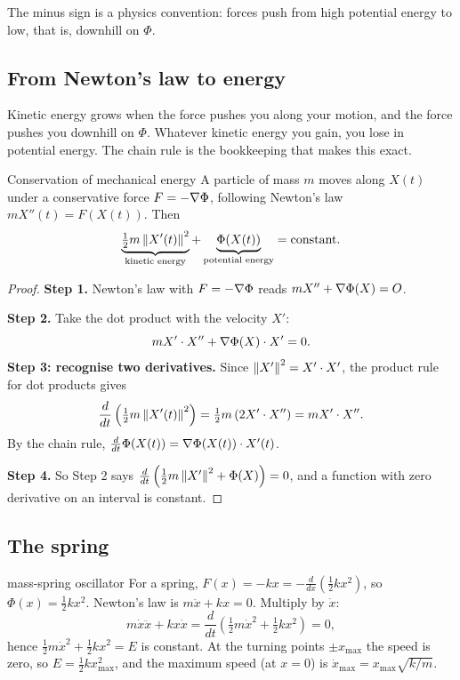 The minus sign is a physics convention: forces push from high potential energy to low, that
is, downhill on $\Phi$.

\subsection{From Newton's law to energy}

\begin{intuition}
Kinetic energy grows when the force pushes you along your motion, and the force pushes
you downhill on $\Phi$. Whatever kinetic energy you gain, you lose in potential energy.
The chain rule is the bookkeeping that makes this exact.
\end{intuition}

\begin{theorem}{Conservation of mechanical energy}
A particle of mass $m$ moves along $X(t)$ under a conservative force $F=-\nabla\Phi$,
following Newton's law $mX''(t)=F(X(t))$. Then
\[
\underbrace{\tfrac12m\left\lVert X'(t)\right\rVert^2}_{\text{kinetic energy}}+\underbrace{\Phi(X(t))}_{\text{potential energy}}=\text{constant}.
\]
\end{theorem}

\begin{proof}
\textbf{Step 1.} Newton's law with $F=-\nabla\Phi$ reads $mX''+\nabla\Phi(X)=O$.

\textbf{Step 2.} Take the dot product with the velocity $X'$:
\[ mX'\cdot X''+\nabla\Phi(X)\cdot X'=0 . \]
\textbf{Step 3: recognise two derivatives.} Since $\left\lVert X'\right\rVert^2=X'\cdot X'$, the product
rule for dot products gives
\[ \frac{d}{dt}\left(\tfrac12m\left\lVert X'(t)\right\rVert^2\right)=\tfrac12m\,(2X'\cdot X'')=mX'\cdot X'' . \]
By the chain rule, $\frac{d}{dt}\Phi(X(t))=\nabla\Phi(X(t))\cdot X'(t)$.

\textbf{Step 4.} So Step 2 says
$\frac{d}{dt}\left(\tfrac12m\left\lVert X'\right\rVert^2+\Phi(X)\right)=0$, and a function with zero
derivative on an interval is constant.
\end{proof}

\subsection{The spring}

\begin{example}{mass-spring oscillator}
For a spring, $F(x)=-kx=-\frac{d}{dx}\left(\tfrac12kx^2\right)$, so $\Phi(x)=\tfrac12kx^2$.
Newton's law is $m\ddot x+kx=0$. Multiply by $\dot x$:
\[ m\dot x\ddot x+kx\dot x=\frac{d}{dt}\left(\tfrac12m\dot x^2+\tfrac12kx^2\right)=0, \]
hence $\tfrac12m\dot x^2+\tfrac12kx^2=E$ is constant. At the turning points $\pm x_{\max}$
the speed is zero, so $E=\tfrac12kx_{\max}^2$, and the maximum speed (at $x=0$) is
$\dot x_{\max}=x_{\max}\sqrt{k/m}$.
\end{example}

